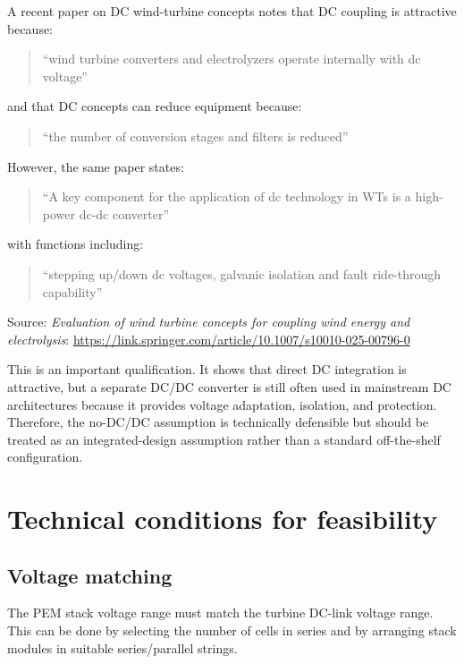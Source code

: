 \documentclass[
  letterpaper,
  DIV=11,
  numbers=noendperiod]{scrartcl}
\begin{document}
A recent paper on DC wind-turbine concepts notes that DC coupling is
attractive because:

\begin{quote}
``wind turbine converters and electrolyzers operate internally with dc
voltage''
\end{quote}

and that DC concepts can reduce equipment because:

\begin{quote}
``the number of conversion stages and filters is reduced''
\end{quote}

However, the same paper states:

\begin{quote}
``A key component for the application of dc technology in WTs is a
high-power dc-dc converter''
\end{quote}

with functions including:

\begin{quote}
``stepping up/down dc voltages, galvanic isolation and fault
ride-through capability''
\end{quote}

Source: \emph{Evaluation of wind turbine concepts for coupling wind
energy and electrolysis}:
\url{https://link.springer.com/article/10.1007/s10010-025-00796-0}

This is an important qualification. It shows that direct DC integration
is attractive, but a separate DC/DC converter is still often used in
mainstream DC architectures because it provides voltage adaptation,
isolation, and protection. Therefore, the no-DC/DC assumption is
technically defensible but should be treated as an integrated-design
assumption rather than a standard off-the-shelf configuration.

\section{Technical conditions for
feasibility}\label{technical-conditions-for-feasibility}

\subsection{Voltage matching}\label{voltage-matching}

The PEM stack voltage range must match the turbine DC-link voltage
range. This can be done by selecting the number of cells in series and
by arranging stack modules in suitable series/parallel strings.
\end{document}

